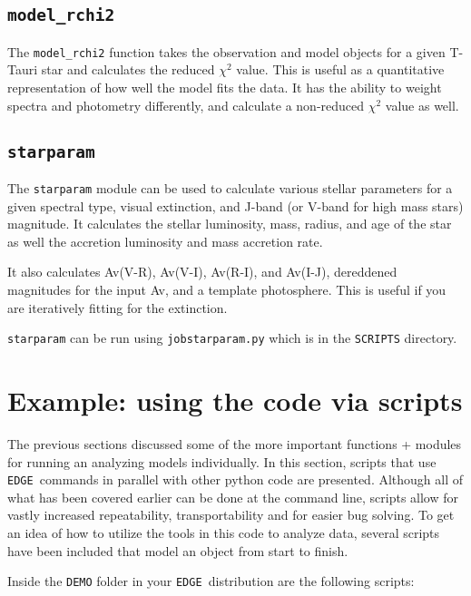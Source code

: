 \documentclass{article}
\newcommand{\edge}{\texttt{EDGE }}
\begin{document}
\subsection{\texttt{model\_rchi2}}
 
\noindent The \texttt{model\_rchi2} function takes the observation and model objects for a given T-Tauri star and calculates the reduced $\chi^2$ value. This is useful as a quantitative representation of how well the model fits the data. It has the ability to weight spectra and photometry differently, and calculate a non-reduced $\chi^2$ value as well. 

\subsection{\texttt{starparam}}

\noindent The \texttt{starparam} module can be used to calculate various stellar parameters for a given spectral type, visual extinction, and J-band (or V-band for high mass stars) magnitude.  It calculates the stellar luminosity, mass, radius, and age of the star as well the accretion luminosity and mass accretion rate.

\noindent It also calculates Av(V-R), Av(V-I), Av(R-I), and Av(I-J), dereddened magnitudes for the input Av, and a template photosphere. This is useful if you are iteratively fitting for the extinction. 

\texttt{starparam} can be run using \texttt{jobstarparam.py} which is in the \texttt{SCRIPTS} directory.

\section{Example: using the code via scripts} \label{scripts}

\noindent The previous sections discussed some of the more important functions + modules for running an analyzing models individually. In this section, scripts that use \edge commands in parallel with other python code are presented. Although all of what has been covered earlier can be done at the command line, scripts allow for vastly increased repeatability, transportability and for easier bug solving. To get an idea of how to utilize the tools in this code to analyze data, several scripts have been included that model an object from start to finish.

\noindent Inside the \texttt{DEMO} folder in your \edge distribution are the following scripts:
\end{document}
